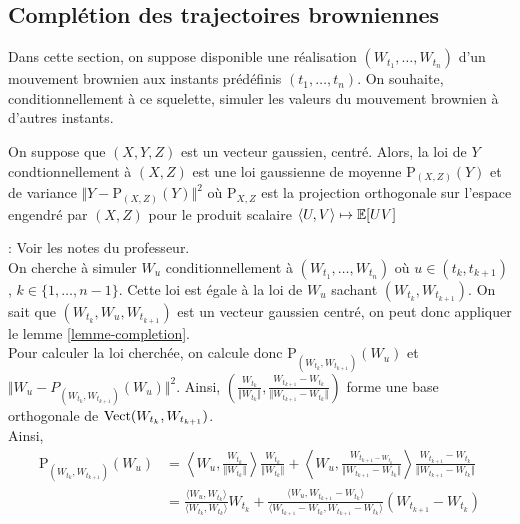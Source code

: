 \subsection{Complétion des trajectoires browniennes}

\renewcommand{\P}{\mathrm{P}}

Dans cette section, on suppose disponible une réalisation $(W_{t_1},\ldots,W_{t_n})$ d'un mouvement brownien aux instants prédéfinis $(t_1,\ldots,t_n)$. 
On souhaite, conditionnellement à ce squelette, simuler les valeurs du mouvement brownien à d'autres instants.

\begin{lem}
  \label{lemme-completion}
  On suppose que $(X,Y,Z)$ est un vecteur gaussien, centré. Alors, la loi de $Y$ condtionnellement à $(X,Z)$ est une loi gaussienne de moyenne $\P_{(X,Z)}(Y)$ et de variance $\Vert Y - \P_{(X,Z)}(Y) \Vert^2$ où $\P_{X,Z}$ est la projection orthogonale sur l'espace engendré par $(X,Z)$ pour le produit scalaire $ \langle U, V \rangle \mapsto \mathbb{E}[UV]$
\end{lem}

\Preuve : Voir les notes du professeur. \\

On cherche à simuler $W_u$ conditionnellement à $(W_{t_1},\ldots,W_{t_n})$ où $u \in (t_{k},t_{k + 1})$, $k \in \{1, \ldots, n-1 \}$. Cette loi est égale à la loi de $W_u$ sachant $(W_{t_k}, W_{t_{k+1}})$. On sait que $(W_{t_k}, W_u, W_{t_{k+1}})$ est un vecteur gaussien centré, on peut donc appliquer le lemme \ref{lemme-completion}. \\

Pour calculer la loi cherchée, on calcule donc $\P_{(W_{t_k}, W_{t_{k+1}})}(W_u)$ et $ \Vert W_u - P_{(W_{t_k}, W_{t_{k+1}})}(W_u) \Vert^2$.
Ainsi, $\left( \frac{W_{t_k}}{\Vert W_{t_k}\Vert}, \frac{ W_{t_{k+1}}-W_{t_k} }{\Vert W_{t_{k+1}}-W_{t_k} \Vert }\right)$ forme une base orthogonale de $\mathrm{Vect}(W_{t_k}, W_{t_{k+1}})$. \\

Ainsi,
\begin{equation*}
\begin{split}
  \P_{\left( W_{t_k}, W_{t_{k+1}} \right)} (W_u) &= \left\langle W_u, \frac{W_{t_k}}{\Vert W_{t_k} \Vert} \right\rangle \frac{W_{t_k}}{\Vert W_{t_k} \Vert} + \left\langle W_u, \frac{W_{t_{k+1} - W_{t_k}}}{\Vert W_{t_{k+1}} - W_{t_k} \Vert} \right\rangle \frac{W_{t_{k+1}} - W_{t_k}}{\Vert W_{t_{k+1}} - W_{t_k} \Vert} \\
  &= \frac{ \langle W_u, W_{t_k} \rangle}{ \langle W_{t_k}, W_{t_k} \rangle} W_{t_k} + \frac{ \langle W_u, W_{t_{k+1}} - W_{t_k} \rangle}{ \langle W_{t_{k+1}} - W_{t_k},W_{t_{k+1}} - W_{t_k}  \rangle} \left(W_{t_{k+1}} - W_{t_k}\right)
\end{split}
\end{equation*}

